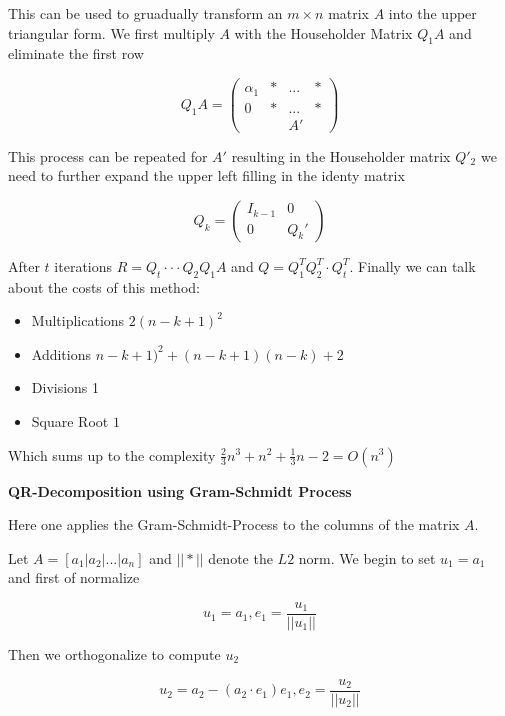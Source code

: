 \documentclass{report}
\begin{document}
This can be used to gruadually transform an $m \times n$ matrix $A$ into the upper triangular form. We first multiply $A$ with the Householder Matrix $Q_1A$ and eliminate the first row

\begin{equation}
    Q_1 A = \begin{pmatrix} \alpha_1 & * & ... & * \\ 0 & * & ... & * \\ & & A' &  \end{pmatrix}
\end{equation}

This process can be repeated for $A'$ resulting in the Householder matrix $Q'_2$ we need to further expand the upper left filling in the identy matrix

\begin{equation}
    Q_k = \begin{pmatrix} I_{k-1} & 0 \\ 0 & Q_k' \end{pmatrix}
\end{equation}

After $t$ iterations $R = Q_t \cdot\cdot \cdot Q_2 Q_1 A$ and $Q = Q_1^T Q_2^T \cdot Q_t^T$. Finally we can talk about the costs of this method:

\begin{itemize}
  \item Multiplications $2(n-k+1)^2$ 
      \item Additions $n-k+1)^2 + (n-k+1)(n-k) + 2$ 
           \item Divisions 1 
               \item Square Root $1$
\end{itemize}

Which sums up to the complexity $\frac{2}{3}n^3 + n^2 + \frac{1}{3}n-2 = O(n^3)$

\textbf{QR-Decomposition using Gram-Schmidt Process}

Here one applies the Gram-Schmidt-Process to the columns of the matrix $A$. 

Let $A = [a_1 | a_2| ... |a_n]$ and $||*||$ denote the $L2$ norm. We begin to set $u_1 = a_1$ and first of normalize

\begin{equation}
    u_1 = a_1, e_1 = \frac{u_1}{||u_1||}
\end{equation}

Then we orthogonalize to compute $u_2$

 \begin{equation}
    u_2 = a_2 - (a_2 \cdot e_1)e_1, e_2 = \frac{u_2}{||u_2||}
\end{equation}
\end{document}
